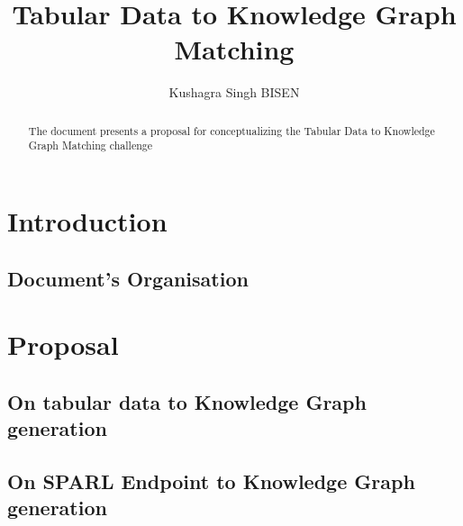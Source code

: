 \documentclass[runningheads]{llncs}
\begin{document}
%
\title{Tabular Data to Knowledge Graph Matching}
%
%
\author{Kushagra Singh BISEN}
%
%
%
\maketitle              %
%
\begin{abstract}
The document presents a proposal for conceptualizing the Tabular Data to Knowledge Graph Matching challenge

\end{abstract}


\section{Introduction}
\subsection{Document's Organisation}

\section{Proposal}
\subsection{On tabular data to Knowledge Graph generation}



\subsection{On SPARL Endpoint to Knowledge Graph generation}
\end{document}
